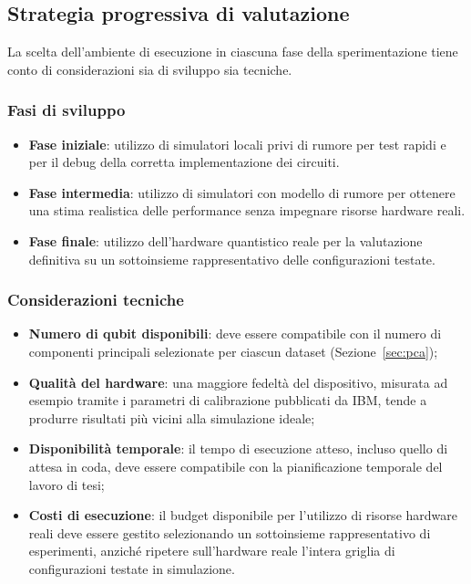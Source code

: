 \subsection{Strategia progressiva di valutazione}
\label{sec:strategia_valutazione}

La scelta dell'ambiente di esecuzione in ciascuna fase della sperimentazione tiene conto di considerazioni sia di sviluppo sia tecniche.

\subsubsection{Fasi di sviluppo}
\begin{itemize}
    \item \textbf{Fase iniziale}: utilizzo di simulatori locali privi di rumore per test rapidi e per il debug della corretta implementazione dei circuiti.
    \item \textbf{Fase intermedia}: utilizzo di simulatori con modello di rumore per ottenere una stima realistica delle performance senza impegnare risorse hardware reali.
    \item \textbf{Fase finale}: utilizzo dell'hardware quantistico reale per la valutazione definitiva su un sottoinsieme rappresentativo delle configurazioni testate.
\end{itemize}

\subsubsection{Considerazioni tecniche}
\begin{itemize}
    \item \textbf{Numero di qubit disponibili}: deve essere compatibile con il numero di componenti principali selezionate per ciascun dataset (Sezione~\ref{sec:pca});
    \item \textbf{Qualità del hardware}: una maggiore fedeltà del dispositivo, misurata ad esempio tramite i parametri di calibrazione pubblicati da IBM, tende a produrre risultati più vicini alla simulazione ideale;
    \item \textbf{Disponibilità temporale}: il tempo di esecuzione atteso, incluso quello di attesa in coda, deve essere compatibile con la pianificazione temporale del lavoro di tesi;
    \item \textbf{Costi di esecuzione}: il budget disponibile per l'utilizzo di risorse hardware reali deve essere gestito selezionando un sottoinsieme rappresentativo di esperimenti, anziché ripetere sull'hardware reale l'intera griglia di configurazioni testate in simulazione.
\end{itemize}

